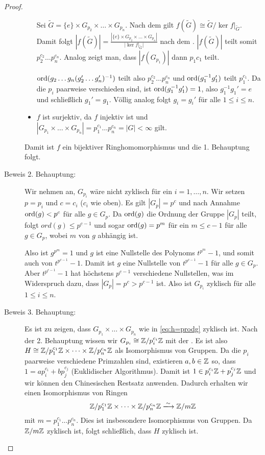 \documentclass[12pt,a4paper]{scrartcl}
\begin{document}
\begin{proof}
\begin{description}
\begin{itemize}
			Sei $\tilde{G} = \{e\}\times G_{p_2}\times\dots\times G_{p_n}$. Nach dem  gilt $f(\tilde{G})\cong \tilde {G}/\ker f|_{\tilde{G}}$. Damit folgt $|f(\tilde{G})| = \frac{|\{e\}\times G_{p_2}\times\dots\times G_{p_n}|}{|\ker f|_{\tilde{G}}|}$ nach dem . $|f(\tilde{G})|$ teilt somit $p_2^{c_2}\dots p_n^{c_n}$. Analog zeigt man, dass $|f(G_{p_1})|$ dann $p_1{c_1}$ teilt. 
			
			$\operatorname{ord} (g_2\dots g_n(g_2'\dots g_n')^{-1})$ teilt also $p_2^{c_2}\dots p_n^{c_n}$ und $\operatorname{ord}(g_1^{-1}g_1')$ teilt $p_1^{c_1}$. Da die $p_i$ paarweise verschieden sind, ist $\operatorname{ord}(g_1^{-1}g_1') = 1$, also $g_1^{-1}g_1' = e$ und schließlich $g_1' = g_1$. Völlig analog folgt $g_i = g_i'$ für alle $1\leq i\leq n$.
			\item $f$ ist surjektiv, da $f$ injektiv  ist und $|G_{p_1}\times\dots\times G_{p_n}| = p_1^{c_1}\dots p_n^{c_n} = |G|<\infty$ gilt.
		\end{itemize}
	Damit ist $f$ ein bijektiver Ringhomomorphismus und die 1. Behauptung folgt.
	\item[Beweis 2. Behauptung:] Wir nehmen an, $G_{p_i}$ wäre nicht zyklisch für ein $i=1,\dots,n$. Wir setzen $p = p_i$ und $c = c_i$ ($c_i$ wie oben). Es gilt $|G_p| = p^c$ und nach Annahme $\operatorname{ord}(g)<p^c$ für alle $g\in G_p$. Da $\operatorname{ord}(g)$ die Ordnung der Gruppe $|G_p|$ teilt, folgt $ord(g)\leq p^{c-1}$ und sogar $\operatorname{ord}(g) = p^m$ für ein $m\leq c-1$ für alle $g\in G_p$, wobei $m$ von $g$ abhängig ist.
	
	Also ist $g^{p^m} = 1$ und $g$ ist eine Nullstelle des Polynoms $t^{p^m}-1$, und somit auch von $t^{p^{c-1}}-1$. Damit ist $g$ eine Nullstelle von $t^{p^{c-1}}-1$ für alle $g\in G_p$. Aber $t^{p^{c-1}}-1$ hat höchstens $p^{c-1}$ verschiedene Nullstellen, was im Widerspruch dazu, dass $|G_p| = p^c> p^{c-1}$ ist. Also ist $G_{p_i}$ zyklisch für alle $1\leq i\leq n$.
	\item[Beweis 3. Behauptung:] Es ist zu zeigen, dass $G_{p_1}\times\dots\times G_{p_n}$ wie in \eqref{eq:h=prodg} zyklisch ist. Nach der 2. Behauptung wissen wir $G_{p_i}\cong \mathbb Z/p_i^{c_i}\mathbb Z$ mit der . Es ist also $H\cong \mathbb Z/p_1^{c_1} \mathbb Z\times\dots \times \mathbb Z/p_n^{c_n}\mathbb Z$ als Isomorphismus von Gruppen. Da die $p_i$ paarweise verschiedene Primzahlen sind, existieren $a,b\in\mathbb Z$ so, dass $1 = ap_i^{c_i}+bp_j^{c_j}$ (Euklidischer Algorithmus). Damit ist $1\in p_i^{c_i}\mathbb Z+p_j^{c_j}\mathbb Z$ und wir können den Chinesischen Restsatz anwenden. Dadurch erhalten wir einen Isomorphismus von Ringen
	$$\IZ/p_1^{c_1}\IZ\times\dots \times\IZ/p_n^{c_n}\IZ \xlongrightarrow{\sim} \IZ/m\IZ$$
	mit $m = p_1^{c_1}\dots p_n^{c_n}$. Dies ist insbesondere Isomorphismus von Gruppen. Da $\mathbb Z/m\mathbb Z$ zyklisch ist, folgt schließlich, dass $H$ zyklisch ist.
	\qedhere
\end{description}
\end{proof}
\end{document}
